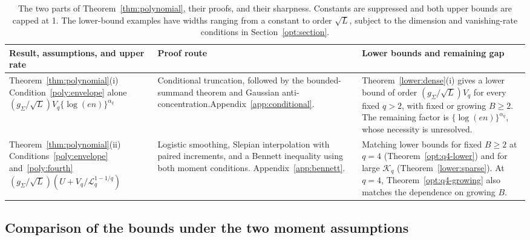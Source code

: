 \documentclass[11pt,letterpaper]{article}
\newcommand{\vSix}[1]{{\color{magenta}#1}}
\theoremstyle{remark}
\begin{document}
\begin{table}[htbp]
\centering

\small
\renewcommand{\arraystretch}{1.15}
\begin{tabularx}{\textwidth}{@{}>{\raggedright\arraybackslash}p{}
 >{\raggedright\arraybackslash}p{}
 >{\raggedright\arraybackslash}X@{}}
\toprule
Result, assumptions, and upper rate & Proof route & Lower bounds and remaining gap\\
\midrule
Theorem~\ref{thm:polynomial}\textup{(i)}\newline
Condition~\eqref{poly:envelope} alone\newline
\vSix{\((g_\Sigma/\sqrt L)V_q\{\log(en)\}^{\alpha_q}\)}
& Conditional truncation, followed by the bounded-summand theorem and
Gaussian anti-concentration.\newline Appendix~\ref{app:conditional}.
& Theorem~\ref{lower:dense}\textup{(i)} gives a lower bound of order
\vSix{\((g_\Sigma/\sqrt L)V_q\)} for every fixed \(q>2\),
with fixed or growing \(B\ge2\).
The remaining factor is \(\{\log(en)\}^{\alpha_q}\), whose
necessity is unresolved.\\[0.6em]
Theorem~\ref{thm:polynomial}\textup{(ii)}\newline
Conditions~\eqref{poly:envelope} and~\eqref{poly:fourth}\newline
\vSix{\((g_\Sigma/\sqrt L)(U+V_q/\mathcal L_q^{1-1/q})\)}
& Logistic smoothing, Slepian interpolation with paired increments, and
a Bennett inequality using both moment conditions.\newline
Appendix~\ref{app:bennett}.
& Matching lower bounds for fixed \(B\ge2\) at \(q=4\)
(Theorem~\ref{opt:q4-lower}) and for large \(\mathcal K_q\)
(Theorem~\ref{lower:sparse}). At \(q=4\),
Theorem~\ref{opt:q4-growing} also matches the dependence on growing \(B\).\\
\bottomrule
\end{tabularx}
\caption{The two parts of Theorem~\ref{thm:polynomial}, their proofs,
and their sharpness. Constants are suppressed and both upper bounds
are capped at 1. \vSix{The lower-bound examples have widths
ranging from a constant to order \(\sqrt L\), subject to the
dimension and vanishing-rate conditions in Section~\ref{opt:section}.}}
\label{poly:summary}
\end{table}

\subsection{\texorpdfstring{{Comparison of the bounds under the two moment assumptions}}{Comparison of the bounds under the two moment assumptions}}\label{poly:transition}
\end{document}

